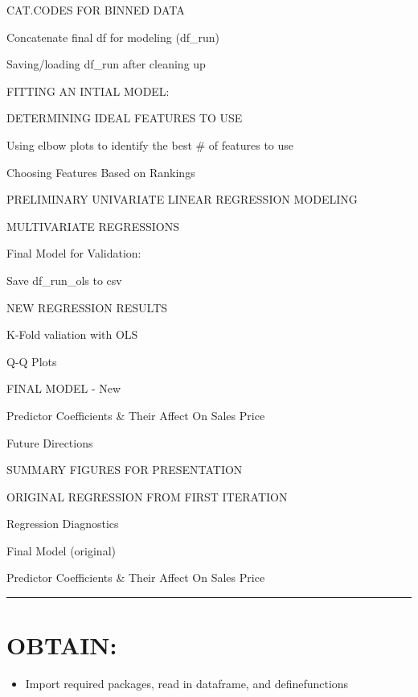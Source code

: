 \documentclass[11pt]{article}
\providecommand{\tightlist}{%
      \setlength{\itemsep}{0pt}\setlength{\parskip}{0pt}}
\begin{document}
{CAT.CODES FOR BINNED DATA}

{Concatenate final df for modeling (df\_run)}

{Saving/loading df\_run after cleaning up}

{FITTING AN INTIAL MODEL:}

{DETERMINING IDEAL FEATURES TO USE}

{Using elbow plots to identify the best \# of features to use}

{Choosing Features Based on Rankings}

{PRELIMINARY UNIVARIATE LINEAR REGRESSION MODELING}

{MULTIVARIATE REGRESSIONS}

{Final Model for Validation:}

{Save df\_run\_ols to csv}

{NEW REGRESSION RESULTS}

{K-Fold valiation with OLS}

{Q-Q Plots}

{FINAL MODEL - New}

{Predictor Coefficients \& Their Affect On Sales Price}

{Future Directions}

{SUMMARY FIGURES FOR PRESENTATION}

{ORIGINAL REGRESSION FROM FIRST ITERATION}

{Regression Diagnostics}

{Final Model (original)}

{Predictor Coefficients \& Their Affect On Sales Price}

    \begin{center}\rule{0.5\linewidth}{\linethickness}\end{center}

    \hypertarget{obtain}{%
\section{OBTAIN:}\label{obtain}}

\begin{itemize}
\tightlist
\item
  Import required packages, read in dataframe, and definefunctions
\end{itemize}
\end{document}
